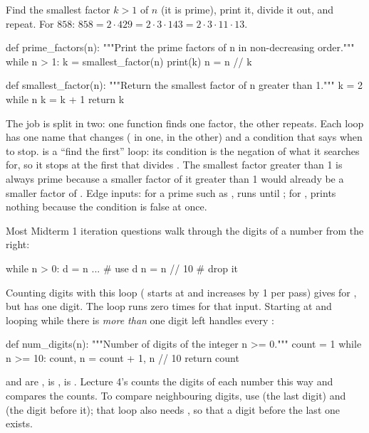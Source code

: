 \documentclass[10pt]{scrartcl}
\begin{document}
\begin{example*}
Find the smallest factor $k>1$ of $n$ (it is prime), print it, divide it out, and repeat. For $858$: $858=2\cdot429=2\cdot3\cdot143=2\cdot3\cdot11\cdot13$.
\begin{py}
def prime_factors(n):
    """Print the prime factors of n in non-decreasing order."""
    while n > 1:
        k = smallest_factor(n)
        print(k)
        n = n // k

def smallest_factor(n):
    """Return the smallest factor of n greater than 1."""
    k = 2
    while n %
        k = k + 1
    return k
\end{py}
The job is split in two: one function finds one factor, the other repeats. Each loop has one name that changes ( in one,  in the other) and a condition that says when to stop.  is a ``find the first'' loop: its condition is the negation of what it searches for, so it stops at the first  that divides . The smallest factor greater than 1 is always prime because a smaller factor of it greater than 1 would already be a smaller factor of . Edge inputs: for a prime such as ,  runs until ; for ,  prints nothing because the condition  is false at once.
\end{example*}

\begin{example*}[The digit loop, and the edge case \cd{n = 0}: counting digits]
Most Midterm 1 iteration questions walk through the digits of a number from the right:
\begin{py}
while n > 0:
    d = n %
    ...             # use d
    n = n // 10     # drop it
\end{py}
Counting digits with this loop ( starts at  and increases by 1 per pass) gives  for , but  has one digit. The loop runs zero times for that input. Starting at  and looping while there is \emph{more than} one digit left handles every :
\begin{py}
def num_digits(n):
    """Number of digits of the integer n >= 0."""
    count = 1
    while n >= 10:
        count, n = count + 1, n // 10
    return count
\end{py}
 and  are ,  is ,  is . Lecture 4's  counts the digits of each number this way and compares the counts. To compare neighbouring digits, use  (the last digit) and  (the digit before it); that loop also needs \mbox{}, so that a digit before the last one exists.
\end{example*}
\end{document}
